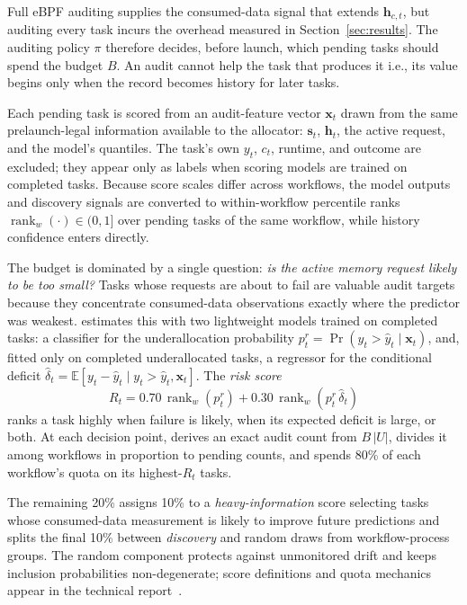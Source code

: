 Full eBPF auditing supplies the consumed-data signal that extends
$\mathbf{h}_{c,t}$, but auditing every task incurs the overhead measured
in Section~\ref{sec:results}. The auditing policy $\pi$ therefore decides,
before launch, which pending tasks should spend the budget $B$. An audit
cannot help the task that produces it i.e., its value begins only when the
record becomes history for later tasks.

Each pending task is scored from an audit-feature vector $\mathbf{x}_t$
drawn from the same prelaunch-legal information available to the
allocator: $\mathbf{s}_t$, $\mathbf{h}_t$, the active request, and the
model's quantiles. The task's own $y_t$, $c_t$, runtime, and outcome are
excluded; they appear only as labels when scoring models are trained on
completed tasks. Because score scales differ across workflows, the model
outputs and discovery signals are converted to within-workflow percentile
ranks $\operatorname{rank}_w(\cdot) \in (0,1]$ over pending tasks of the
same workflow, while history confidence enters directly.

The budget is dominated by a single question: \emph{is the active memory
request likely to be too small?} Tasks whose requests are about to fail
are valuable audit targets because they concentrate consumed-data
observations exactly where the predictor was weakest. \toolname{} estimates
this with two lightweight models trained
on completed tasks: a classifier for the underallocation probability
$p_t^r = \Pr(y_t > \hat y_t \mid \mathbf{x}_t)$, and, fitted only on
completed underallocated tasks, a regressor for the conditional deficit
$\hat\delta_t = \mathbb{E}[y_t - \hat y_t \mid y_t > \hat y_t,
\mathbf{x}_t]$. The \emph{risk score}
\begin{equation}
R_t = 0.70\,\operatorname{rank}_w(p_t^r)
    + 0.30\,\operatorname{rank}_w(p_t^r\,\hat\delta_t)
\label{eq:audit-risk}
\end{equation}
ranks a task highly when failure is likely, when its expected deficit is
large, or both. At each decision point, \toolname{} derives an exact audit
count from $B\,|U|$, divides it among workflows in proportion to pending
counts, and spends 80\% of each workflow's quota on its highest-$R_t$
tasks.

The remaining 20\% assigns 10\% to a \emph{heavy-information} score
selecting tasks whose consumed-data measurement is likely to improve future
predictions and splits the final 10\% between \emph{discovery} and random
draws from workflow-process groups. The random
component protects against unmonitored drift and keeps inclusion
probabilities non-degenerate; score definitions and quota mechanics
appear in the technical report~\cite{camp2026techreport}.

